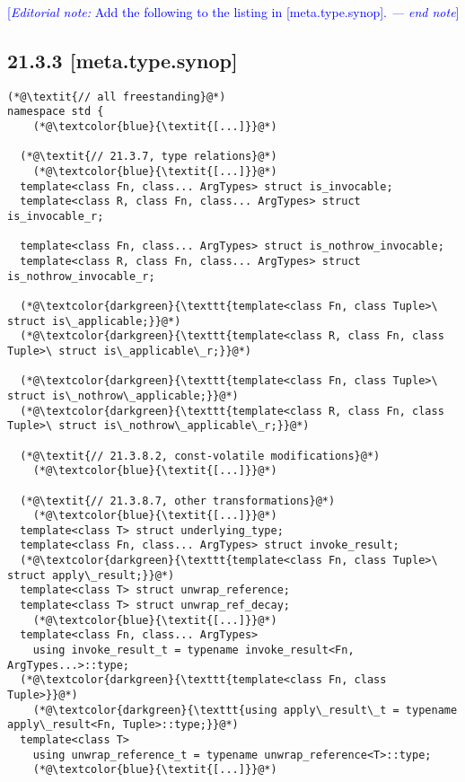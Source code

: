 \documentclass{article}
\begin{document}
\textcolor{blue}{[\textit{Editorial note:} Add the following to the listing in [meta.type.synop]. \textit{--- end note}]}

\subsection{21.3.3 [meta.type.synop]}
\begin{lstlisting}[style=base]
(*@\textit{// all freestanding}@*)
namespace std {
    (*@\textcolor{blue}{\textit{[...]}}@*)

  (*@\textit{// 21.3.7, type relations}@*)
    (*@\textcolor{blue}{\textit{[...]}}@*)
  template<class Fn, class... ArgTypes> struct is_invocable;
  template<class R, class Fn, class... ArgTypes> struct is_invocable_r;

  template<class Fn, class... ArgTypes> struct is_nothrow_invocable;
  template<class R, class Fn, class... ArgTypes> struct is_nothrow_invocable_r;

  (*@\textcolor{darkgreen}{\texttt{template<class Fn, class Tuple>\ struct is\_applicable;}}@*)
  (*@\textcolor{darkgreen}{\texttt{template<class R, class Fn, class Tuple>\ struct is\_applicable\_r;}}@*)

  (*@\textcolor{darkgreen}{\texttt{template<class Fn, class Tuple>\ struct is\_nothrow\_applicable;}}@*)
  (*@\textcolor{darkgreen}{\texttt{template<class R, class Fn, class Tuple>\ struct is\_nothrow\_applicable\_r;}}@*)
  
  (*@\textit{// 21.3.8.2, const-volatile modifications}@*)
    (*@\textcolor{blue}{\textit{[...]}}@*)

  (*@\textit{// 21.3.8.7, other transformations}@*)
    (*@\textcolor{blue}{\textit{[...]}}@*)
  template<class T> struct underlying_type;
  template<class Fn, class... ArgTypes> struct invoke_result;
  (*@\textcolor{darkgreen}{\texttt{template<class Fn, class Tuple>\ struct apply\_result;}}@*)
  template<class T> struct unwrap_reference;
  template<class T> struct unwrap_ref_decay;
    (*@\textcolor{blue}{\textit{[...]}}@*)
  template<class Fn, class... ArgTypes>
    using invoke_result_t = typename invoke_result<Fn, ArgTypes...>::type;
  (*@\textcolor{darkgreen}{\texttt{template<class Fn, class Tuple>}}@*)
    (*@\textcolor{darkgreen}{\texttt{using apply\_result\_t = typename apply\_result<Fn, Tuple>::type;}}@*)
  template<class T>
    using unwrap_reference_t = typename unwrap_reference<T>::type;
    (*@\textcolor{blue}{\textit{[...]}}@*)


\end{lstlisting}
\end{document}
